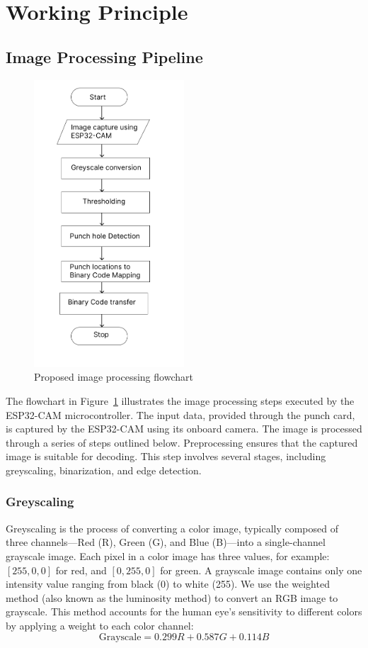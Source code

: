 \section{Working Principle}
\subsection{Image Processing Pipeline}

\begin{figure}[h!]
    \centering
    \includegraphics[width=0.5\textwidth]{content/images/imageProcessing.png}
    \caption{Proposed image processing flowchart}
        \label{fig:imageProcessingFlowchart}
\end{figure}

The flowchart in Figure~\ref{fig:imageProcessingFlowchart} illustrates the image processing steps executed by the ESP32-CAM microcontroller. The input data, provided through the punch card, is captured by the ESP32-CAM using its onboard camera. The image is processed through a series of steps outlined below. Preprocessing ensures that the captured image is suitable for decoding. This step involves several stages, including greyscaling, binarization, and edge detection.

\subsubsection{Greyscaling}
Greyscaling is the process of converting a color image, typically composed of three channels—Red (R), Green (G), and Blue (B)—into a single-channel grayscale image. Each pixel in a color image has three values, for example: \([255, 0, 0]\) for red, and \([0, 255, 0]\) for green. A grayscale image contains only one intensity value ranging from black (0) to white (255). We use the weighted method (also known as the luminosity method) to convert an RGB image to grayscale. This method accounts for the human eye’s sensitivity to different colors by applying a weight to each color channel:
\[
\text{Grayscale} = 0.299R + 0.587G + 0.114B
\]

